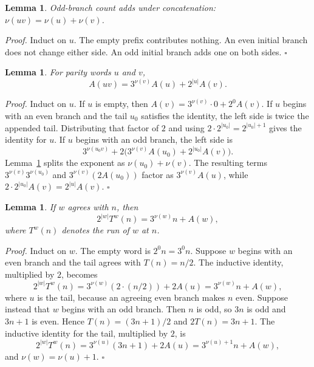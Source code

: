 \documentclass[11pt,letterpaper]{article}
\newtheorem{lemma}[theorem]{Lemma}
\newenvironment{proof}{\noindent\textit{Proof.}}{\hfill\(\square\)}
\begin{document}
\begin{lemma}
\label{lem:count-append}
Odd-branch count adds under concatenation: \(\nu(uv)=\nu(u)+\nu(v)\).
\end{lemma}

\begin{proof}
Induct on \(u\). The empty prefix contributes nothing. An even initial branch does not change either side. An odd initial branch adds one on both sides.
\end{proof}

\begin{lemma}
\label{lem:numerator-append}
For parity words \(u\) and \(v\),
\[
A(uv)=3^{\nu(v)}A(u)+2^{|u|}A(v).
\]
\end{lemma}

\begin{proof}
Induct on \(u\). If \(u\) is empty, then \(A(v)=3^{\nu(v)}\cdot 0+2^{0}A(v)\). If \(u\) begins with an even branch and the tail \(u_0\) satisfies the identity, the left side is twice the appended tail. Distributing that factor of \(2\) and using \(2\cdot 2^{|u_0|}=2^{|u_0|+1}\) gives the identity for \(u\). If \(u\) begins with an odd branch, the left side is
\[
3^{\nu(u_0v)}+2\bigl(3^{\nu(v)}A(u_0)+2^{|u_0|}A(v)\bigr).
\]
Lemma~\ref{lem:count-append} splits the exponent as \(\nu(u_0)+\nu(v)\). The resulting terms \(3^{\nu(v)}3^{\nu(u_0)}\) and \(3^{\nu(v)}(2A(u_0))\) factor as \(3^{\nu(v)}A(u)\), while \(2\cdot 2^{|u_0|}A(v)=2^{|u|}A(v)\).
\end{proof}

\begin{lemma}
\label{lem:affine}
If \(w\) agrees with \(n\), then
\[
2^{|w|}T^{w}(n)=3^{\nu(w)}n+A(w),
\]
where \(T^{w}(n)\) denotes the run of \(w\) at \(n\).
\end{lemma}

\begin{proof}
Induct on \(w\). The empty word is \(2^{0}n=3^{0}n\). Suppose \(w\) begins with an even branch and the tail agrees with \(T(n)=n/2\). The inductive identity, multiplied by \(2\), becomes
\[
2^{|w|}T^{w}(n)=3^{\nu(w)}(2\cdot(n/2))+2A(u)=3^{\nu(w)}n+A(w),
\]
where \(u\) is the tail, because an agreeing even branch makes \(n\) even. Suppose instead that \(w\) begins with an odd branch. Then \(n\) is odd, so \(3n\) is odd and \(3n+1\) is even. Hence \(T(n)=(3n+1)/2\) and \(2T(n)=3n+1\). The inductive identity for the tail, multiplied by \(2\), is
\[
2^{|w|}T^{w}(n)=3^{\nu(u)}(3n+1)+2A(u)=3^{\nu(u)+1}n+A(w),
\]
and \(\nu(w)=\nu(u)+1\).
\end{proof}
\end{document}
